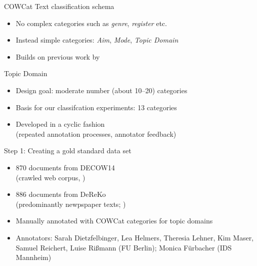 \documentclass{beamer}
\begin{document}
\begin{frame}
  {COWCat}
  Text classification schema  \citep{SchaeferBildhauer2012a}\\

  \begin{itemize}
    \item No complex categories such as \textit{genre}, \textit{register} etc.
    \item Instead simple categories: \textit{Aim}, \textit{Mode}, \alert{\textit{Topic Domain}}
    \item Builds on previous work by \citet{Sharoff2006}
    \end{itemize}

\pause
    Topic Domain\\

    \begin{itemize}
    \item Design goal: moderate number (about 10--20) categories
    \item Basis for our classifcation experiments: 13 categories
    \item Developed in a cyclic fashion\\
    (repeated annotation processes, annotator feedback)
  \end{itemize}
\end{frame}

\begin{frame}
  {Step 1: Creating a gold standard data set}
  \begin{itemize}
    \item 870 documents from DECOW14\\
    (crawled web corpus, \citealp{SchaeferBildhauer2012a,Schaefer2015b})
    \item 886 documents from DeReKo\\
    (predominantly newpspaper texts; \citealp{KupietzEa2010})
    \item Manually annotated with COWCat categories for topic domains
      \vspace{0.5cm}
    \item {\footnotesize Annotators: Sarah Dietzfelbinger, Lea Helmers, Theresia Lehner, Kim Maser, Samuel Reichert, Luise Rißmann (FU Berlin); Monica Fürbacher (IDS Mannheim)}
  \end{itemize}
\end{frame}
\end{document}
